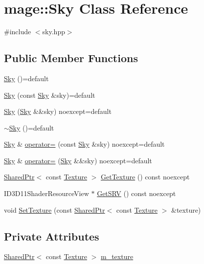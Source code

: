 \hypertarget{classmage_1_1_sky}{}\section{mage\+:\+:Sky Class Reference}
\label{classmage_1_1_sky}


{\ttfamily \#include $<$sky.\+hpp$>$}

\subsection*{Public Member Functions}
\begin{DoxyCompactItemize}
\item 
\hyperlink{classmage_1_1_sky_a4e54074f11814aee89e2554f35e551aa}{Sky} ()=default
\item 
\hyperlink{classmage_1_1_sky_ab041650afed6344cd7874308def5c35c}{Sky} (const \hyperlink{classmage_1_1_sky}{Sky} \&sky)=default
\item 
\hyperlink{classmage_1_1_sky_a2b9a9737f82d1e390c2f50acc2c686e7}{Sky} (\hyperlink{classmage_1_1_sky}{Sky} \&\&sky) noexcept=default
\item 
\hyperlink{classmage_1_1_sky_a42c605bd010c1c6576c3ecf32cd0e962}{$\sim$\+Sky} ()=default
\item 
\hyperlink{classmage_1_1_sky}{Sky} \& \hyperlink{classmage_1_1_sky_a34b877c6cff140cae6a207337651ea4e}{operator=} (const \hyperlink{classmage_1_1_sky}{Sky} \&sky) noexcept=default
\item 
\hyperlink{classmage_1_1_sky}{Sky} \& \hyperlink{classmage_1_1_sky_a049fa5006b4afc50ad3fe29702815d35}{operator=} (\hyperlink{classmage_1_1_sky}{Sky} \&\&sky) noexcept=default
\item 
\hyperlink{namespacemage_a1e01ae66713838a7a67d30e44c67703e}{Shared\+Ptr}$<$ const \hyperlink{classmage_1_1_texture}{Texture} $>$ \hyperlink{classmage_1_1_sky_abd49f247b3a376475471310d6396386b}{Get\+Texture} () const noexcept
\item 
I\+D3\+D11\+Shader\+Resource\+View $\ast$ \hyperlink{classmage_1_1_sky_ae72817d4b5015b985234183b6474f5d6}{Get\+S\+RV} () const noexcept
\item 
void \hyperlink{classmage_1_1_sky_aceb336c88ac33bb8490987812414578c}{Set\+Texture} (const \hyperlink{namespacemage_a1e01ae66713838a7a67d30e44c67703e}{Shared\+Ptr}$<$ const \hyperlink{classmage_1_1_texture}{Texture} $>$ \&texture)
\end{DoxyCompactItemize}
\subsection*{Private Attributes}
\begin{DoxyCompactItemize}
\item 
\hyperlink{namespacemage_a1e01ae66713838a7a67d30e44c67703e}{Shared\+Ptr}$<$ const \hyperlink{classmage_1_1_texture}{Texture} $>$ \hyperlink{classmage_1_1_sky_a4f9e8b3658134a04284174c419390a17}{m\+\_\+texture}
\end{DoxyCompactItemize}


